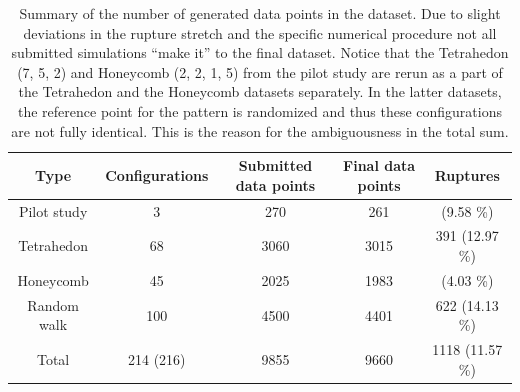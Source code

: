 \begin{table}[H]
  \begin{center}
  \caption{Summary of the number of generated data points in the dataset. Due to slight deviations in the rupture stretch and the specific numerical procedure not all submitted simulations ``make it'' to the final dataset. Notice that the Tetrahedon (7, 5, 2) and Honeycomb (2, 2, 1, 5) from the pilot study are rerun as a part of the Tetrahedon and the Honeycomb datasets separately. In the latter datasets, the reference point for the pattern is randomized and thus these configurations are not fully identical. This is the reason for the ambiguousness in the total sum.}
  \label{tab:dataset_summary}
  \begin{tabular}{ | c | c | c | c | c |} \hline
  \textbf{Type} & \textbf{Configurations} & \textbf{Submitted data points} & \textbf{Final data points} & \textbf{Ruptures} \\ \hline
  Pilot study & 3 & 270 & 261 & \: 25 \: (9.58 \%)\\ \hline
  Tetrahedon & 68 & 3060 & 3015 & 391 (12.97 \%)\\ \hline
  Honeycomb & 45 & 2025 & 1983 & \: 80 \: (4.03 \%)\\ \hline
  Random walk & 100 & 4500 & 4401 & 622 (14.13 \%) \\ \Xhline{2\arrayrulewidth}
  Total & 214 (216) & 9855 & 9660 & 1118 (11.57 \%) \\ \hline
  \end{tabular}
  \end{center}
\end{table}


